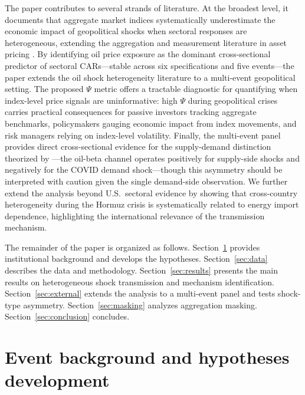 \documentclass[12pt,preprint,authoryear]{elsarticle}
\begin{document}
The paper contributes to several strands of literature. At the broadest level, it documents that aggregate market indices systematically underestimate the economic impact of geopolitical shocks when sectoral responses are heterogeneous, extending the aggregation and measurement literature in asset pricing \citep{vuolteenaho2002what,gupta2021disaggregated}. By identifying oil price exposure as the dominant cross-sectional predictor of sectoral CARs---stable across six specifications and five events---the paper extends the oil shock heterogeneity literature \citep{kilian2009not,arouri2012oil,elyasiani2011oil,broadstock2012oil} to a multi-event geopolitical setting. The proposed $\Psi$ metric offers a tractable diagnostic for quantifying when index-level price signals are uninformative: high $\Psi$ during geopolitical crises carries practical consequences for passive investors tracking aggregate benchmarks, policymakers gauging economic impact from index movements, and risk managers relying on index-level volatility. Finally, the multi-event panel provides direct cross-sectional evidence for the supply-demand distinction theorized by \citet{kilian2009not}---the oil-beta channel operates positively for supply-side shocks and negatively for the COVID demand shock---though this asymmetry should be interpreted with caution given the single demand-side observation. We further extend the analysis beyond U.S.\ sectoral evidence by showing that cross-country heterogeneity during the Hormuz crisis is systematically related to energy import dependence, highlighting the international relevance of the transmission mechanism.

The remainder of the paper is organized as follows. Section~\ref{sec:background} provides institutional background and develops the hypotheses. Section~\ref{sec:data} describes the data and methodology. Section~\ref{sec:results} presents the main results on heterogeneous shock transmission and mechanism identification. Section~\ref{sec:external} extends the analysis to a multi-event panel and tests shock-type asymmetry. Section~\ref{sec:masking} analyzes aggregation masking. Section~\ref{sec:conclusion} concludes.

\section{Event background and hypotheses development}\label{sec:background}
\end{document}
